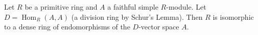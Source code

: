 Let $R$ be a primitive ring and $A$ a faithful simple $R$-module. Let $D = \operatorname{Hom}_R(A,A)$ (a division ring by Schur's Lemma). Then $R$ is isomorphic to a dense ring of endomorphisms of the $D$-vector space $A$.
